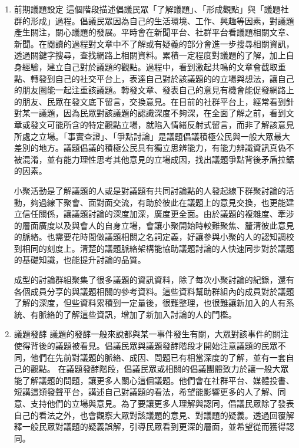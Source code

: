 \documentclass[12pt,a4paper]{article}
\begin{document}
\begin{enumerate}
\item 前期議題設定
\label{sec:org463fc97}
這個階段描述倡議民眾「了解議題」、「形成觀點」與「議題社群的形成」過程。倡議民眾因為自己的生活環境、工作、興趣等因素，對議題產生關注，關心議題的發展。平時會在新聞平台、社群平台看議題相關文章、新聞。在閱讀的過程對文章中不了解或有疑義的部分會進一步搜尋相關資訊，透過關鍵字搜尋，查找網路上相關資料。累積一定程度對議題的了解，加上自身經驗，建立自己對於議題的觀點。過程中，看到激起共鳴的文章會截取重點、轉發到自己的社交平台上，表達自己對於該議題的的立場與想法，讓自己的朋友圈能一起注重該議題。轉發文章、發表自己的意見有機會能促發網路上的朋友、民眾在發文底下留言，交換意見。在目前的社群平台上，經常看到針對某一議題，因為民眾對該議題的認識深度不夠深，在全面了解之前，看到文章或發文可能所含的特定觀點立場，就陷入情緒反射式留言，而非了解該意見所處之立場。「事實查證」、「爭點討論」是議題倡議積極公民與一般大眾最大差別的地方。議題倡議的積極公民具有獨立思辨能力，有能力辨識資訊真偽不被混淆，並有能力理性思考其他意見的立場成因，找出議題爭點背後矛盾拉鋸的因素。

小聚活動是了解議題的人或是對議題有共同討論點的人發起線下群聚討論的活動，夠過線下聚會、面對面交流，有助於彼此在議題上的意見交換，也更能建立信任關係，讓議題討論的深度加深，廣度更全面。由於議題的複雜度、牽涉的層面廣度以及與會人的自身立場，會讓小聚開始時較難聚焦、釐清彼此意見的脈絡。也需要花時間做議題相關之名詞定義，好讓參與小聚的人的認知調校到相同的刻度上。清楚的議題脈絡架構能協助議題討論的人快速同步對於議題的基礎知識，也能提升討論的品質。

成型的討論群組聚集了很多議題的資訊資料，除了每次小聚討論的紀錄，還有各個成員分享的與議題相關的參考資料。這些資料幫助群組內的成員對於議題了解的深度，但些資料累積到一定量後，很難整理，也很難讓新加入的人有系統、有脈絡的了解這些資訊，增加了新加入討論的人的門檻。

\item 議題發酵
\label{sec:org0783720}
議題的發酵一般來說都與某一事件發生有關，大眾對該事件的關注使得背後的議題被看見。倡議民眾與議題發酵階段才開始注意議題的民眾不同，他們在先前對議題的脈絡、成因、問題已有相當深度的了解，並有一套自己的觀點。 在議題發酵階段，倡議民眾或相關的倡議團體致力於讓一般大眾能了解議題的問題，讓更多人關心這個議題。他們會在社群平台、媒體投書、短講這類發聲平台，講述自己對議題的看法，希望能影響更多的人了解、同意、支持他們的立場與意見。為了要讓更多人理解與認同，倡議民眾除了發表自己的看法之外，也會觀察大眾對該議題的意見、對議題的疑義。透過回覆解釋一般民眾對議題的疑義誤解，引導民眾看到更深的層面，並希望從而獲得認同。


\end{enumerate}
\end{document}
